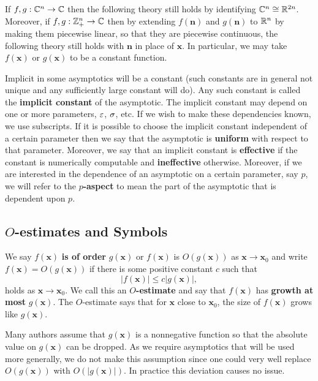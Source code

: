     \begin{remark}
      If $f,g: \mathbb{C}^{n} \to \mathbb{C}$ then the following theory still holds by identifying $\mathbb{C}^{n} \cong \mathbb{R}^{2n}$. Moreover, if $f,g:\mathbb{Z}_{+}^{n} \to \mathbb{C}$ then by extending $f(\mathbf{n})$ and $g(\mathbf{n})$ to $\mathbb{R}^{n}$ by making them piecewise linear, so that they are piecewise continuous, the following theory still holds with $\mathbf{n}$ in place of $\mathbf{x}$. In particular, we may take $f(\mathbf{x})$ or $g(\mathbf{x})$ to be a constant function.
    \end{remark}

    Implicit in some asymptotics will be a constant (such constants are in general not unique and any sufficiently large constant will do). Any such constant is called the \textbf{implicit constant} of the asymptotic. The implicit constant may depend on one or more parameters, $\varepsilon$, $\sigma$, etc. If we wish to make these dependencies known, we use subscripts. If it is possible to choose the implicit constant independent of a certain parameter then we say that the asymptotic is \textbf{uniform} with respect to that parameter. Moreover, we say that an implicit constant is \textbf{effective} if the constant is numerically computable and \textbf{ineffective} otherwise. Moreover, if we are interested in the dependence of an asymptotic on a certain parameter, say $p$, we will refer to the \textbf{$p$-aspect} to mean the part of the asymptotic that is dependent upon $p$.
    \subsection*{\texorpdfstring{$O$}{O}-estimates and Symbols}
      We say $f(\mathbf{x})$ \textbf{is of order} $g(\mathbf{x})$ or $f(\mathbf{x})$ is $O(g(\mathbf{x}))$ as $\mathbf{x} \to \mathbf{x}_{0}$ and write $f(\mathbf{x}) = O(g(\mathbf{x}))$
      if there is some positive constant $c$ such that
      \[
        |f(\mathbf{x})| \le c|g(\mathbf{x})|,
      \]
      holds as $\mathbf{x} \to \mathbf{x}_{0}$. We call this an \textbf{$O$-estimate} and say that $f(\mathbf{x})$ has \textbf{growth at most} $g(\mathbf{x})$. The $O$-estimate says that for $\mathbf{x}$ close to $\mathbf{x}_{0}$, the size of $f(\mathbf{x})$ grows like $g(\mathbf{x})$.
      
      \begin{remark}
        Many authors assume that $g(\mathbf{x})$ is a nonnegative function so that the absolute value on $g(\mathbf{x})$ can be dropped. As we require asymptotics that will be used more generally, we do not make this assumption since one could very well replace $O(g(\mathbf{x}))$ with $O(|g(\mathbf{x})|)$. In practice this deviation causes no issue.
      \end{remark}
      
